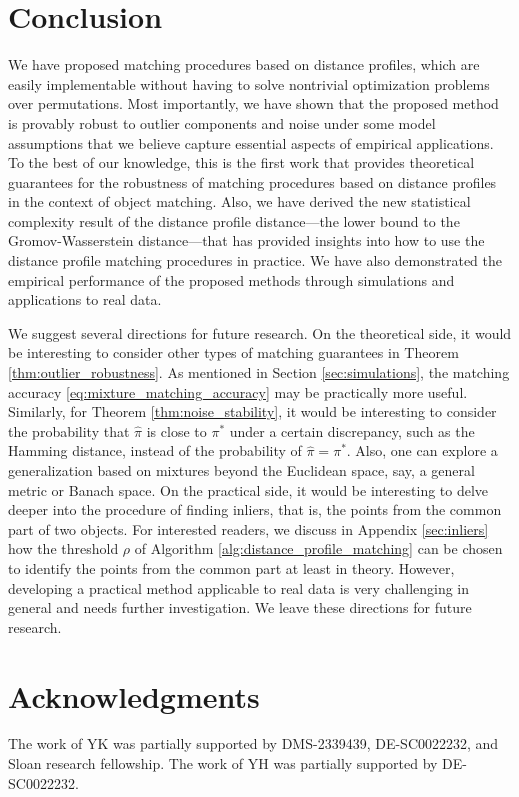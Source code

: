 \documentclass[11pt,letterpaper]{article}
\theoremstyle{definition}
\numberwithin{equation}{section}
\begin{document}
\section{Conclusion}
We have proposed matching procedures based on distance profiles, which are easily implementable without having to solve nontrivial optimization problems over permutations. Most importantly, we have shown that the proposed method is provably robust to outlier components and noise under some model assumptions that we believe capture essential aspects of empirical applications. To the best of our knowledge, this is the first work that provides theoretical guarantees for the robustness of matching procedures based on distance profiles in the context of object matching. Also, we have derived the new statistical complexity result of the distance profile distance---the lower bound to the Gromov-Wasserstein distance---that has provided insights into how to use the distance profile matching procedures in practice. We have also demonstrated the empirical performance of the proposed methods through simulations and applications to real data.

We suggest several directions for future research. On the theoretical side, it would be interesting to consider other types of matching guarantees in Theorem \ref{thm:outlier_robustness}. As mentioned in Section \ref{sec:simulations}, the matching accuracy \eqref{eq:mixture_matching_accuracy} may be practically more useful. Similarly, for Theorem \ref{thm:noise_stability}, it would be interesting to consider the probability that $\hat{\pi}$ is close to $\pi^\ast$ under a certain discrepancy, such as the Hamming distance, instead of the probability of $\hat{\pi} = \pi^\ast$. Also, one can explore a generalization based on mixtures beyond the Euclidean space, say, a general metric or Banach space. On the practical side, it would be interesting to delve deeper into the procedure of finding inliers, that is, the points from the common part of two objects. For interested readers, we discuss in Appendix \ref{sec:inliers} how the threshold $\rho$ of Algorithm \ref{alg:distance_profile_matching} can be chosen to identify the points from the common part at least in theory. However, developing a practical method applicable to real data is very challenging in general and needs further investigation. We leave these directions for future research.

\section*{Acknowledgments}
The work of YK was partially supported by DMS-2339439, DE-SC0022232, and Sloan research fellowship. The work of YH was partially supported by DE-SC0022232.
\end{document}
